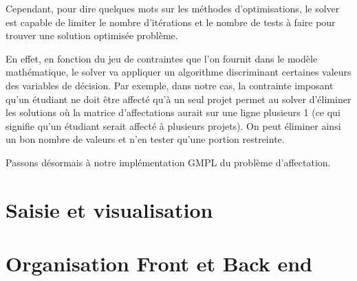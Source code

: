 \documentclass{polytech/polytech}
\begin{document}
Cependant, pour dire quelques mots sur les méthodes d'optimisations, le solver est capable de limiter le nombre d'itérations et le nombre de tests à faire pour trouver une solution optimisée problème.

En effet, en fonction du jeu de contraintes que l'on fournit dans le modèle mathématique, le solver va appliquer un algorithme discriminant certaines valeurs des variables de décision.
 Par exemple, dans notre cas, la contrainte imposant qu'un étudiant ne doit être affecté qu'à un seul projet permet au solver d'éliminer les
solutions où la matrice d'affectations aurait sur une ligne plusieurs 1 (ce qui signifie qu'un étudiant serait affecté à plusieurs projets).
 On peut éliminer ainsi un bon nombre de valeurs et n'en tester qu'une portion restreinte.
 
Passons désormais à notre implémentation GMPL du problème d'affectation.

\section{Saisie et visualisation}
\section{Organisation Front et Back end}

\end{document}
